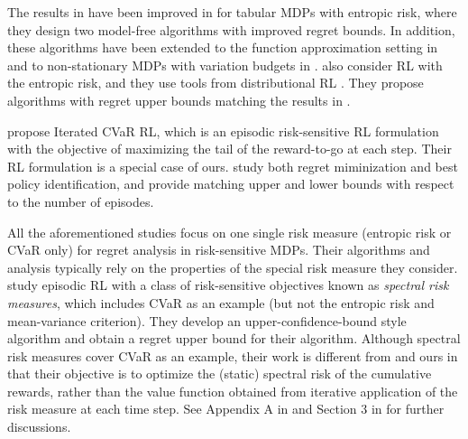 \documentclass[11pt]{article}
\newcommand{\1}{\mathbbm{1}}
\begin{document}
The results in \cite{fei2020risk} have been improved in \cite{fei2021exponential} for tabular MDPs with entropic risk, where they design two model-free algorithms with improved regret bounds. In addition, these algorithms have been  extended to the function approximation setting in \cite{fei2021risk} and to non-stationary MDPs with variation budgets in \cite{ding2022non}. \cite{liang2022bridging} also consider RL with the entropic risk, and they use tools from  distributional RL \citep{bellemare2017distributional}. They propose algorithms with regret upper bounds matching the results in \cite{fei2021exponential}.


\cite{du2022risk} propose Iterated CVaR RL, which is an episodic risk-sensitive RL formulation with the objective of maximizing the tail of the reward-to-go at each step. Their RL formulation is a special case of ours. \cite{du2022risk} study both regret miminization and best policy identification, and provide matching upper and lower bounds with respect to the number of episodes. 


All the aforementioned studies focus on one single risk measure (entropic risk or CVaR only) for regret analysis in risk-sensitive MDPs. Their algorithms and analysis typically rely on the properties of the special risk measure they consider. 
\cite{bastani2022regret} study episodic RL with a class of risk-sensitive objectives known as \textit{spectral risk measures}, which includes CVaR as an example (but not the entropic risk and mean-variance criterion). 
They develop an upper-confidence-bound style algorithm and obtain a regret upper bound for their algorithm. Although spectral risk measures cover CVaR as an example, their work is different from \cite{du2022risk} and ours in that their objective is to optimize the (static) spectral risk of the cumulative rewards, rather than the value function obtained from iterative application of the risk measure at each time step.  
 See Appendix A in \cite{du2022risk} and Section 3 in \cite{bastani2022regret} for further discussions.
\end{document}
